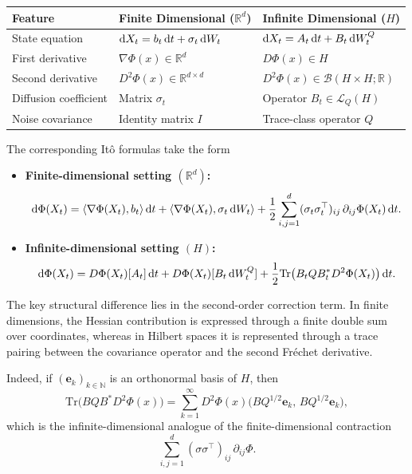 \documentclass[12pt]{amsart}
\newcommand{\D}[1]{\mbox{\rm #1}}
\newcommand{\dd}{\D{d}}
\numberwithin{equation}{section}
\begin{document}
\begin{table}[H]
\centering
\begin{tabular}{@{}lll@{}}
\toprule
\textbf{Feature} & \textbf{Finite Dimensional ($\mathbb{R}^d$)} & \textbf{Infinite Dimensional ($H$)} \\ \midrule
State equation &
$\dd X_t = b_t\,\dd t + \sigma_t\,\dd W_t$
&
$\dd X_t = A_t\,\dd t + B_t\,\dd W_t^Q$
\\[0.3em]

First derivative &
$\nabla \Phi(x)\in\mathbb{R}^d$
&
$D\Phi(x)\in H$
\\[0.3em]

Second derivative &
$D^2\Phi(x)\in\mathbb{R}^{d\times d}$
&
$D^2\Phi(x)\in\mathscr B(H\times H;\mathbb R)$
\\[0.3em]

Diffusion coefficient \; &
Matrix $\sigma_t$
&
Operator $B_t \in \mathscr{L}_Q(H)$
\\[0.3em]

Noise covariance &
Identity matrix $I$
&
Trace-class operator $Q$
\\ \bottomrule
\end{tabular}
\end{table}

The corresponding It\^o formulas take the form

\begin{itemize}
\item \textbf{Finite-dimensional setting $(\mathbb{R}^d)$:}
\[
    \dd \Phi(X_t) = \langle \nabla \Phi(X_t), b_t\rangle\,\dd t + \langle \nabla \Phi(X_t), \sigma_t\,\dd W_t\rangle + \frac{1}{2} \sum_{i,j=1}^d (\sigma_{t} \sigma_{t}^\top)_{ij} \,\partial_{ij}\Phi(X_t)\,\dd t.
\]

\item \textbf{Infinite-dimensional setting $(H)$:}
\[
    \dd \Phi(X_t) = D\Phi(X_t)[A_t]\,\dd t + D\Phi(X_t)[B_t\,\dd W_t^Q] + \frac{1}{2} \mathrm{Tr} \big( B_tQB_t^*D^2\Phi(X_t) \big)\,\dd t.
\]
\end{itemize}

The key structural difference lies in the second-order correction term. In finite dimensions, the Hessian contribution is expressed through a finite double sum over coordinates, whereas in Hilbert spaces it is represented through a trace pairing between the covariance operator and the second Fr\'echet derivative.

Indeed, if $(\mathbf{e}_k)_{k\in\mathbb N}$ is an orthonormal basis of $H$, then
\[
    \mathrm{Tr}\big(BQB^*D^2\Phi(x)\big) = \sum_{k=1}^\infty D^2\Phi(x)\big( BQ^{1/2}\mathbf{e}_k,\, BQ^{1/2}\mathbf{e}_k \big),
\]
which is the infinite-dimensional analogue of the finite-dimensional contraction
\[
    \sum_{i,j=1}^d (\sigma\sigma^\top)_{ij}\, \partial_{ij}\Phi.
\]
\end{document}
